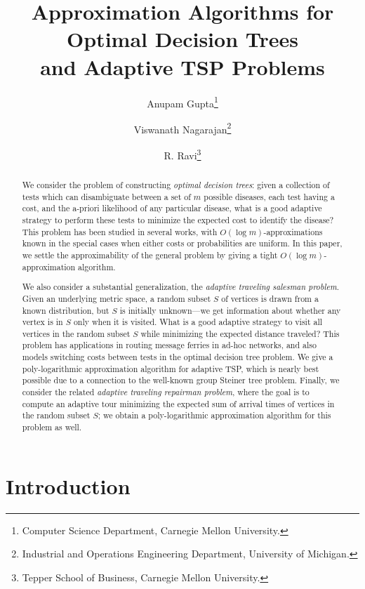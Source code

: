 \documentclass[11pt]{article}
\title{Approximation Algorithms for Optimal Decision Trees  \\ and Adaptive
  TSP Problems}
\author{
Anupam Gupta\thanks{Computer Science Department, Carnegie Mellon
    University.}  \and Viswanath Nagarajan\thanks{ Industrial and Operations Engineering Department, University of Michigan.} \and  R. Ravi\thanks{Tepper School of Business, Carnegie Mellon University.}}
\date{}
\begin{document}
\maketitle
\begin{abstract}
We consider the problem of constructing {\em optimal decision trees}: 
  given a collection of tests which can disambiguate between a set of
  $m$ possible diseases, each test having a cost, and the a-priori
  likelihood of any particular disease, what is a
  good adaptive strategy to perform these tests to minimize the expected
  cost to identify the disease?
This problem has been studied in several works, with $O(\log m)$-approximations known in the special cases when either
costs or probabilities are uniform. In this paper, we settle the approximability of the general problem by giving a tight $O(\log m)$-approximation
algorithm.

We also consider a substantial generalization, the
{\em adaptive traveling salesman problem}. Given an underlying metric space, a random subset $S$ of vertices is drawn
from a known distribution, but $S$ is initially unknown---we get information about whether any vertex is in $S$
only when it is visited. What is a good adaptive strategy to visit all vertices in the random subset $S$ while
minimizing the expected distance traveled? This problem has applications in routing message ferries in ad-hoc networks,
and also models switching costs between tests in the optimal decision tree problem. We give a poly-logarithmic
approximation algorithm for adaptive TSP, which is nearly best possible due to a connection to the well-known group Steiner tree problem. Finally, we consider the related {\em adaptive traveling repairman
problem}, where the goal is to compute an adaptive tour minimizing the expected sum of arrival times of vertices in the random subset $S$; we obtain a poly-logarithmic approximation algorithm for this problem as well.
\end{abstract}





\section{Introduction}
\end{document}
